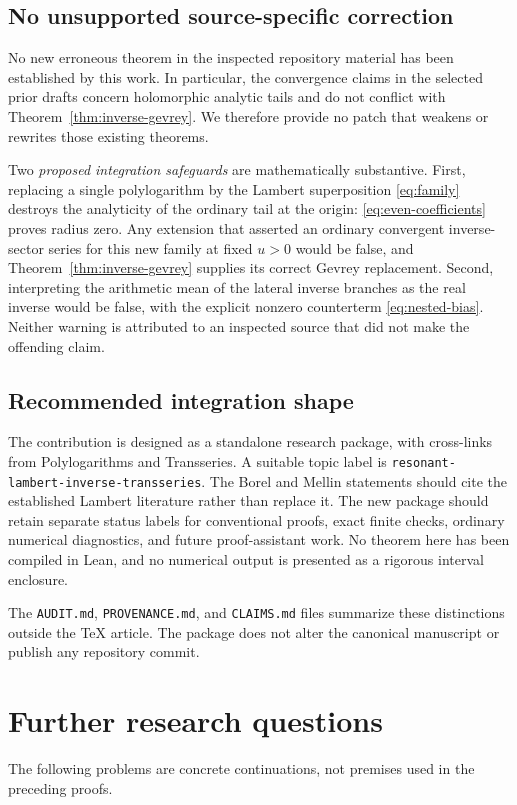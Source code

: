 \documentclass[11pt,a4paper]{article}
\numberwithin{equation}{section}
\theoremstyle{definition}\newtheorem{definition}[theorem]{Definition}
\theoremstyle{remark}\newtheorem{remark}[theorem]{Remark}
\begin{document}
\subsection{No unsupported source-specific correction}
No new erroneous theorem in the inspected repository material has been
established by this work. In particular, the convergence claims in the
selected prior drafts concern holomorphic analytic tails and do not
conflict with Theorem~\ref{thm:inverse-gevrey}. We therefore provide no
patch that weakens or rewrites those existing theorems.

Two \emph{proposed integration safeguards} are mathematically substantive.
First, replacing a single polylogarithm by the Lambert superposition
\eqref{eq:family} destroys the analyticity of the ordinary tail at the
origin: \eqref{eq:even-coefficients} proves radius zero. Any extension
that asserted an ordinary convergent inverse-sector series for this
new family at fixed $u>0$ would be false, and
Theorem~\ref{thm:inverse-gevrey} supplies its correct Gevrey replacement.
Second, interpreting the arithmetic mean of the lateral inverse
branches as the real inverse would be false, with the explicit
nonzero counterterm \eqref{eq:nested-bias}. Neither warning is
attributed to an inspected source that did not make the offending claim.

\subsection{Recommended integration shape}
The contribution is designed as a standalone research package, with
cross-links from Polylogarithms and Transseries. A suitable topic label is
\texttt{resonant-lambert-inverse-transseries}. The Borel and
Mellin statements should cite the established Lambert literature rather
than replace it. The new package should retain separate status labels
for conventional proofs, exact finite checks, ordinary numerical
diagnostics, and future proof-assistant work. No theorem here has been
compiled in Lean, and no numerical output is presented as a rigorous
interval enclosure.

The \texttt{AUDIT.md}, \texttt{PROVENANCE.md}, and \texttt{CLAIMS.md}
files summarize these distinctions outside the TeX article. The package
does not alter the canonical manuscript or publish any repository commit.

\section{Further research questions}
\label{sec:questions}
The following problems are concrete continuations, not premises used
in the preceding proofs.
\end{document}
